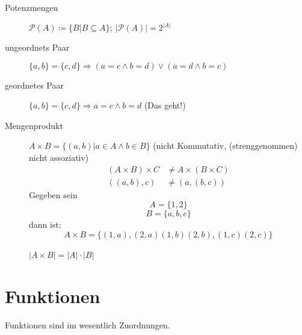 \documentclass[12pt,a4paper]{article}
\begin{document}
\begin{description}
\begin{tabular}{l|l|l}
		\end{tabular}
	\item[Potenzmengen] $\mathcal{P}(A) \coloneqq \lbrace B|B \subseteq A \rbrace;\ |\mathcal{P}(A)| = 2^{|A|}$
	\item[ungeordnets Paar] $\lbrace a,b \rbrace = \lbrace c,d \rbrace \Rightarrow (a=c \wedge b=d) \vee (a=d \wedge b=c)$
	\item[geordnetes Paar] $\lbrace a,b \rbrace = \lbrace c,d \rbrace \Rightarrow a=c \wedge b=d$ (Das geht!)
	\item[Mengenprodukt] $A \times B = \lbrace (a,b)|a \in A \wedge b \in B \rbrace$ (nicht Kommutativ, (strenggenommen) nicht assoziativ)
		\begin{align*}
			(A \times B) \times C & \not = A \times (B \times C) \\
			((a,b),c)             & \not = (a,(b,c))
		\end{align*}
		Gegeben sein
		$$A = \lbrace 1, 2 \rbrace$$
		$$B = \lbrace a, b, c \rbrace$$
		dann ist:
		$$A \times B = \lbrace (1,a),(2,a)(1,b)(2,b),(1,c)(2,c) \rbrace$$ \\
		$|A \times B| = |A| \cdot |B|$
\end{description}
\section{Funktionen}
Funktionen sind im wesentlich Zuordnungen.
\end{document}
